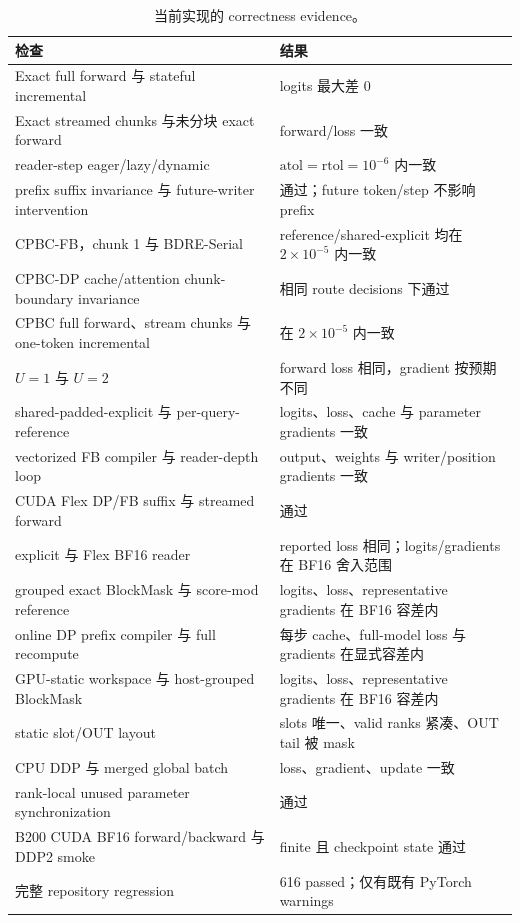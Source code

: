 \documentclass[UTF8,twocolumn,10pt,a4paper]{ctexart}
\newcommand{\DP}{\textsf{CPBC-DP}}
\newcommand{\FB}{\textsf{CPBC-FB}}
\newcommand{\Serial}{\textsf{BDRE-Serial}}
\begin{document}
\begin{table}[t]
\centering
\caption{当前实现的 correctness evidence。}
\label{tab:correctness}
\small
\begin{tabularx}{\textwidth}{Y l}
\toprule
检查 & 结果 \\
\midrule
Exact full forward 与 stateful incremental & logits 最大差 $0$ \\
Exact streamed chunks 与未分块 exact forward & forward/loss 一致 \\
reader-step eager/lazy/dynamic & $\mathrm{atol}=\mathrm{rtol}=10^{-6}$ 内一致 \\
prefix suffix invariance 与 future-writer intervention & 通过；future token/step 不影响 prefix \\
\FB{}，chunk 1 与 \Serial{} & reference/shared-explicit 均在 $2\times10^{-5}$ 内一致 \\
\DP{} cache/attention chunk-boundary invariance & 相同 route decisions 下通过 \\
CPBC full forward、stream chunks 与 one-token incremental & 在 $2\times10^{-5}$ 内一致 \\
$U=1$ 与 $U=2$ & forward loss 相同，gradient 按预期不同 \\
shared-padded-explicit 与 per-query-reference & logits、loss、cache 与 parameter gradients 一致 \\
vectorized FB compiler 与 reader-depth loop & output、weights 与 writer/position gradients 一致 \\
CUDA Flex DP/FB suffix 与 streamed forward & 通过 \\
explicit 与 Flex BF16 reader & reported loss 相同；logits/gradients 在 BF16 舍入范围 \\
grouped exact BlockMask 与 score-mod reference & logits、loss、representative gradients 在 BF16 容差内 \\
online DP prefix compiler 与 full recompute & 每步 cache、full-model loss 与 gradients 在显式容差内 \\
GPU-static workspace 与 host-grouped BlockMask & logits、loss、representative gradients 在 BF16 容差内 \\
static slot/OUT layout & slots 唯一、valid ranks 紧凑、OUT tail 被 mask \\
CPU DDP 与 merged global batch & loss、gradient、update 一致 \\
rank-local unused parameter synchronization & 通过 \\
B200 CUDA BF16 forward/backward 与 DDP2 smoke & finite 且 checkpoint state 通过 \\
完整 repository regression & 616 passed；仅有既有 PyTorch warnings \\
\bottomrule
\end{tabularx}
\end{table}
\end{document}
